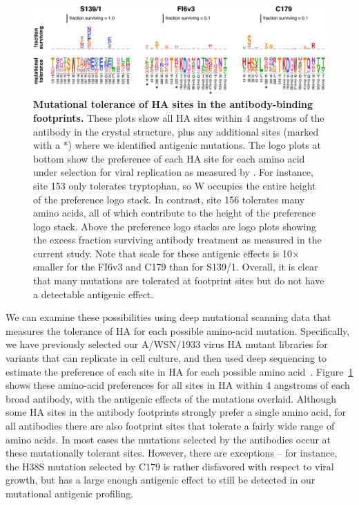 \documentclass[11pt]{article}
\begin{document}
\begin{figure}
\centerline{\includegraphics[width=\textwidth]{figs/prefs_fracsurvive/prefs_fracsurvive_logoplots.pdf}}
\caption{
\label{fig:muttolerance}
{\bf Mutational tolerance of HA sites in the antibody-binding footprints.}
These plots show all HA sites within 4 angstroms of the antibody in the crystal structure, plus any additional sites (marked with a *) where we identified antigenic mutations. 
The logo plots at bottom show the preference of each HA site for each amino acid under selection for viral replication as measured by \citet{doud2016accurate}.
For instance, site 153 only tolerates tryptophan, so W occupies the entire height of the preference logo stack.
In contrast, site 156 tolerates many amino acids, all of which contribute to the height of the preference logo stack. 
Above the preference logo stacks are logo plots showing the excess fraction surviving antibody treatment as measured in the current study.
Note that scale for these antigenic effects is 10$\times$ smaller for the FI6v3 and C179 than for S139/1.
Overall, it is clear that many mutations are tolerated at footprint sites but do not have a detectable antigenic effect.
}
\end{figure}

We can examine these possibilities using deep mutational scanning data that measures the tolerance of HA for each possible amino-acid mutation.
Specifically, we have previously selected our A/WSN/1933 virus HA mutant libraries for variants that can replicate in cell culture, and then used deep sequencing to estimate the preference of each site in HA for each possible amino acid~\citep{doud2016accurate}.
Figure~\ref{fig:muttolerance} shows these amino-acid preferences for all sites in HA within 4 angstroms of each broad antibody, with the antigenic effects of the mutations overlaid.
Although some HA sites in the antibody footprints strongly prefer a single amino acid, for all antibodies there are also footprint sites that tolerate a fairly wide range of amino acids.
In most cases the mutations selected by the antibodies occur at these mutationally tolerant sites.
However, there are exceptions -- for instance, the H38S mutation selected by C179 is rather disfavored with respect to viral growth, but has a large enough antigenic effect to still be detected in our mutational antigenic profiling.
\end{document}
